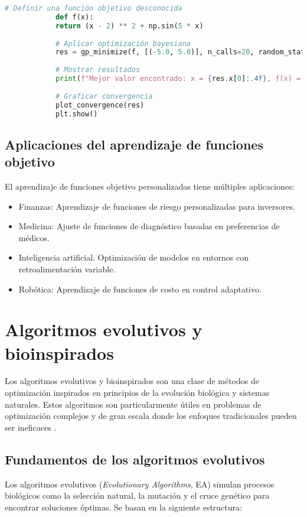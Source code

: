 \begin{itemize}
\begin{lstlisting}[language=Python, caption={Optimización bayesiana en Python}]
			# Definir una función objetivo desconocida
			def f(x):
			return (x - 2) ** 2 + np.sin(5 * x)
			
			# Aplicar optimización bayesiana
			res = gp_minimize(f, [(-5.0, 5.0)], n_calls=20, random_state=42)
			
			# Mostrar resultados
			print(f"Mejor valor encontrado: x = {res.x[0]:.4f}, f(x) = {res.fun:.4f}")
			
			# Graficar convergencia
			plot_convergence(res)
			plt.show()
		\end{lstlisting}
		
		\subsection{Aplicaciones del aprendizaje de funciones objetivo}
		
		El aprendizaje de funciones objetivo personalizadas tiene múltiples aplicaciones:
		
		\begin{itemize}
			\item Finanzas: Aprendizaje de funciones de riesgo personalizadas para inversores.
			\item Medicina: Ajuste de funciones de diagnóstico basadas en preferencias de médicos.
			\item Inteligencia artificial: Optimización de modelos en entornos con retroalimentación variable.
			\item Robótica: Aprendizaje de funciones de costo en control adaptativo.
		\end{itemize}
		\section{Algoritmos evolutivos y bioinspirados}
		
		Los algoritmos evolutivos y bioinspirados son una clase de métodos de optimización inspirados en principios de la evolución biológica y sistemas naturales. Estos algoritmos son particularmente útiles en problemas de optimización complejos y de gran escala donde los enfoques tradicionales pueden ser ineficaces \cite{back1996evolutionary}.
		
		\subsection{Fundamentos de los algoritmos evolutivos}
		
		Los algoritmos evolutivos (\textit{Evolutionary Algorithms}, EA) simulan procesos biológicos como la selección natural, la mutación y el cruce genético para encontrar soluciones óptimas. Se basan en la siguiente estructura:
		

\end{itemize}
